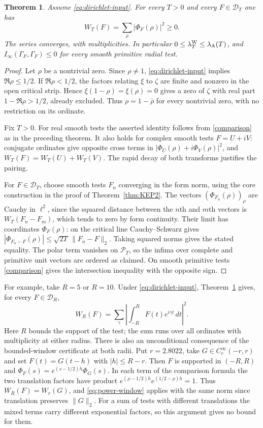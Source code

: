 \documentclass[11pt]{amsart}
\newtheorem{theorem}{Theorem}[section]
\theoremstyle{definition}
\theoremstyle{remark}
\begin{document}
\begin{theorem}\label{thm:all-support}
Assume \eqref{eq:dirichlet-input}. For every $T>0$ and every $F\in\mathcal D_T$ one has
\[
 W_T(F)=\sum_{\rho}|\Phi_F(\rho)|^2\ge0 .
\]
The series converges, with multiplicities. In particular
$0\le\lambda^{\rm W}_T\le\lambda_{\rm A}(T)$, and
$I_\infty(\Gamma_F,\Gamma_F)\le0$ for every smooth primitive radial test.
\end{theorem}
\begin{proof}
Let $\rho$ be a nontrivial zero. Since $\rho\ne1$,
\eqref{eq:dirichlet-input} implies $\Re\rho\le1/2$. If $\Re\rho<1/2$, the factors relating $\xi$ to
$\zeta$ are finite and nonzero in the open critical strip. Hence
$\xi(1-\rho)=\xi(\rho)=0$ gives a zero of $\zeta$ with real part
$1-\Re\rho>1/2$, already excluded. Thus $\rho=1-\bar\rho$ for every
nontrivial zero, with no restriction on its ordinate.

Fix $T>0$. For real smooth tests the asserted identity follows from
\eqref{comparison} as in the preceding theorem. It also holds for complex
smooth tests $F=U+iV$: conjugate ordinates give opposite cross terms in
$|\Phi_U(\rho)+i\Phi_V(\rho)|^2$, and $W_T(F)=W_T(U)+W_T(V)$.
The rapid decay of both transforms justifies the pairing.

For $F\in\mathcal D_T$, choose smooth tests $F_n$ converging in the form
norm, using the core construction in the proof of Theorem~\ref{thm:KEP2}.
The vectors $(\Phi_{F_n}(\rho))_\rho$ are Cauchy in $\ell^2$, since the
squared distance between the $n$th and $m$th vectors is $W_T(F_n-F_m)$,
which tends to zero by form continuity. Their limit has coordinates
$\Phi_F(\rho)$: on the critical line Cauchy--Schwarz gives
$|\Phi_{F_n-F}(\rho)|\le\sqrt{2T}\,\|F_n-F\|_2$. Taking squared norms
gives the stated equality. The polar term vanishes on $\mathcal P_T$,
so the infima over complete and primitive unit vectors are ordered as
claimed. On smooth primitive tests \eqref{comparison} gives the
intersection inequality with the opposite sign.
\end{proof}

For example, take $R=5$ or $R=10$. Under \eqref{eq:dirichlet-input},
Theorem~\ref{thm:all-support} gives, for every $F\in\mathcal D_R$,
\[
 W_R(F)=\sum_{\gamma}
   \left|\int_{-R}^{R}F(t)e^{i\gamma t}\,dt\right|^2 .
\]
Here $R$ bounds the support of the test; the sum runs over all ordinates
with multiplicity at either radius. There is also an unconditional
consequence of the bounded-window certificate at both radii. Put
$r=2.8022$, take $G\in C_c^\infty(-r,r)$ and set $F(t)=G(t-h)$ with
$|h|\le R-r$. Then $F$ is supported in $(-R,R)$ and
$\Phi_F(s)=e^{(s-1/2)h}\Phi_G(s)$. In each term of the comparison
formula the two translation factors have product
$e^{(\rho-1/2)h}e^{(1/2-\rho)h}=1$. Thus
$W_R(F)=W_r(G)$, and \eqref{eq:power-window} applies with the same
norm since translation preserves $\|G\|_2$. For a sum of tests with
different translations the mixed terms carry different exponential
factors, so this argument gives no bound for them.
\end{document}
